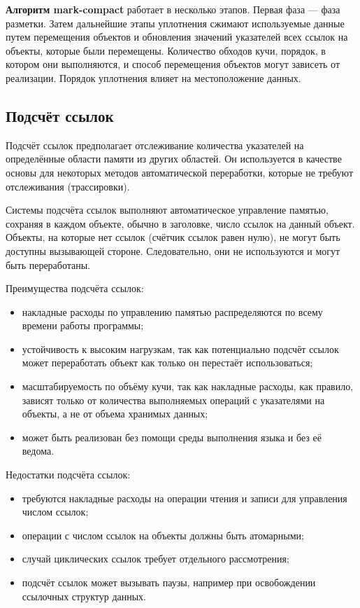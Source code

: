 \textbf{Алгоритм mark-compact} работает в несколько этапов. Первая фаза --- фаза разметки. Затем дальнейшие
этапы уплотнения сжимают используемые данные путем перемещения объектов и обновления значений указателей всех ссылок на объекты, которые были перемещены. Количество обходов кучи, порядок, в котором они выполняются, и способ перемещения объектов могут зависеть от реализации. Порядок уплотнения влияет на местоположение данных.~\cite{handbook}




\subsection{Подсчёт ссылок}

Подсчёт ссылок предполагает отслеживание количества указателей на определённые области памяти из других областей. Он используется в качестве основы для некоторых методов автоматической переработки, которые не требуют отслеживания (трассировки).~\cite{recycling}

Системы подсчёта ссылок выполняют автоматическое управление памятью, сохраняя в каждом объекте, обычно в заголовке, число ссылок на данный объект. Объекты, на которые нет ссылок (счётчик ссылок равен нулю), не могут быть доступны вызывающей стороне. Следовательно, они не используются и могут быть переработаны.~\cite{glossary}

Преимущества подсчёта ссылок:

\begin{itemize}[label*=---]
	\item накладные расходы по управлению памятью распределяются по всему времени работы программы;~\cite{handbook}
	\item устойчивость к высоким нагрузкам, так как потенциально подсчёт ссылок может переработать объект как только он перестаёт использоваться;~\cite{handbook}
	\item масштабируемость по объёму кучи, так как накладные расходы, как правило, зависят только от количества выполняемых операций с указателями на объекты, а не от объема хранимых данных;~\cite{handbook}
	\item может быть реализован без помощи среды выполнения языка и без её ведома.~\cite{handbook}
\end{itemize}

Недостатки подсчёта ссылок:

\begin{itemize}[label*=---]
	\item требуются накладные расходы на операции чтения и записи для управления числом ссылок;
	\item операции с числом ссылок на объекты должны быть атомарными;~\cite{handbook}
	\item случай циклических ссылок требует отдельного рассмотрения;~\cite{handbook}
	\item подсчёт ссылок может вызывать паузы, например при освобождении ссылочных структур данных.~\cite{handbook}
\end{itemize}

